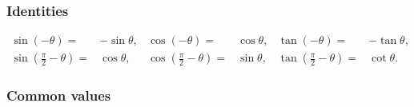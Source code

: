 \documentclass[11pt]{article}
\begin{document}
\subsubsection{Identities}

\[
\begin{array}{rlrlrl}
{\sin( - \theta) =} & {- \sin\theta,} & {\cos( - \theta) =} & {\cos\theta,} & {\tan( - \theta) =} & {- \tan\theta,} \\
{\sin\left( \frac{\pi}{2} - \theta \right) =} & {\cos\theta,} & {\cos\left( \frac{\pi}{2} - \theta \right) =} & {\sin\theta,} & {\tan\left( \frac{\pi}{2} - \theta \right) =} & {\cot\theta.}
\end{array}
\]

\subsubsection{Common values}
\end{document}
